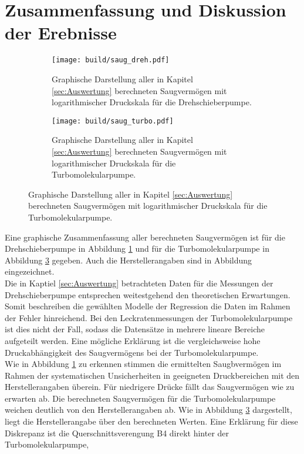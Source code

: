\section{Zusammenfassung und Diskussion der Erebnisse}
\label{sec:Diskussion}
\begin{figure}[ht]
    \begin{subfigure}{0.8\textwidth}
            \centering
            \texttt{[image: build/saug\_dreh.pdf]}
            \caption{Graphische Darstellung aller in Kapitel \ref{sec:Auswertung} berechneten Saugvermögen mit logarithmischer Druckskala für die Drehschieberpumpe.}
            \label{fig:saug_dreh}
    \end{subfigure}
    \hfill
    \begin{subfigure}{0.8\textwidth}
            \centering
            \texttt{[image: build/saug\_turbo.pdf]}
            \caption{Graphische Darstellung aller in Kapitel \ref{sec:Auswertung} berechneten Saugvermögen mit logarithmischer Druckskala für die Turbomolekularpumpe.}
            \label{fig:saug_turbo}
    \end{subfigure}
\end{figure}
Eine graphische Zusammenfassung aller berechneten Saugvermögen ist für die Drehschieberpumpe in 
Abbildung \ref{fig:saug_dreh} und für die Turbomolekularpumpe in Abbildung \ref{fig:saug_turbo} 
gegeben. Auch die Herstellerangaben sind in Abbildung eingezeichnet.
\\
Die in Kaptiel \ref{sec:Auswertung} betrachteten Daten für die Messungen der Drehschieberpumpe 
entsprechen weitestgehend den theoretischen Erwartungen. Somit beschreiben die gewählten 
Modelle der Regression die Daten im Rahmen der Fehler hinreichend. Bei den Leckratenmessungen
der Turbomolekularpumpe ist dies nicht der Fall, sodass die Datensätze in mehrere lineare
Bereiche aufgeteilt werden. Eine mögliche Erklärung ist die vergleichsweise hohe Druckabhängigkeit 
des Saugvermögens bei der Turbomolekularpumpe. 
\\
Wie in Abbildung \ref{fig:saug_dreh} zu erkennen stimmen die ermittelten Saugbvermögen im Rahmen 
der systematischen Unsicherheiten in geeigneten Druckbereichen mit den Herstellerangaben überein.
Für niedrigere Drücke fällt das Saugvermögen wie zu erwarten ab. 
Die berechneten Saugvermögen für die Turbomolekularpumpe weichen deutlich von den Herstellerangaben
ab. Wie in Abbildung \ref{fig:saug_turbo} dargestellt, liegt die Herstellerangabe über den berechneten Werten.
Eine Erklärung für diese Diskrepanz ist die Querschnittsverengung B4 direkt hinter der Turbomolekularpumpe,
